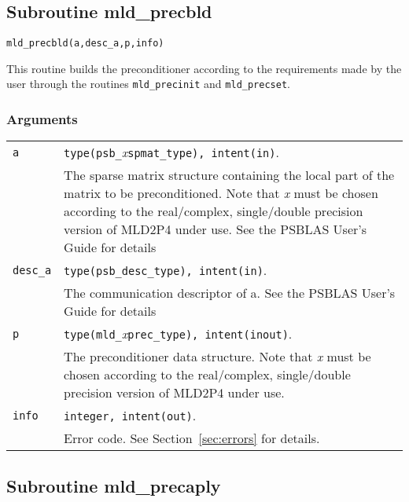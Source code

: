 \clearpage
\subsection{Subroutine mld\_precbld\label{sec:precbld}}

\begin{center}
\verb|mld_precbld(a,desc_a,p,info)|\\
\end{center}

\noindent
This routine builds the preconditioner according to the requirements made by
the user through the routines \verb|mld_precinit| and \verb|mld_precset|.

\subsubsection*{Arguments}

\begin{tabular}{p{1.2cm}p{11.5cm}}
\verb|a|      & \verb|type(psb_|\emph{x}\verb|spmat_type), intent(in)|. \\
              & The sparse matrix structure containing the local part of the
                matrix to be preconditioned. Note that \emph{x} must be chosen according
                to the real/complex, single/double precision version of MLD2P4 under use.
                See the PSBLAS User's Guide for details \cite{ }.\\
\verb|desc_a| & \verb|type(psb_desc_type), intent(in)|. \\
              & The communication descriptor of a. See the PSBLAS User's Guide for
                details \cite{ }.\\
\verb|p|      & \verb|type(mld_|\emph{x}\verb|prec_type), intent(inout)|.\\
              & The preconditioner data structure. Note that \emph{x} must be chosen according
                to the real/complex, single/double precision version of MLD2P4 under use.\\
\verb|info|   & \verb|integer, intent(out)|.\\
              & Error code. See Section~\ref{sec:errors} for details.\\
\end{tabular}

\clearpage
\subsection{Subroutine mld\_precaply\label{sec:precaply}}

